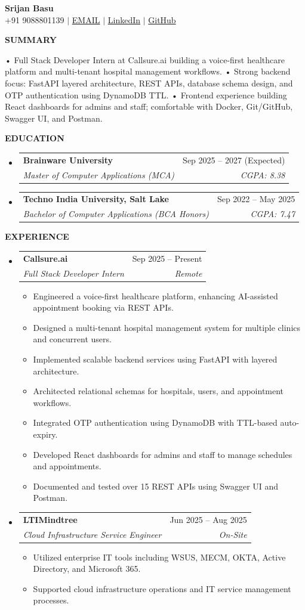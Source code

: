 \documentclass[a4paper,10pt]{article}
\makeatletter
\newcommand{\resheading}[1]{
  \vspace{8pt}
  {\color{black} \textbf{\large #1}}
  \vspace{-5pt}
  \hrulefill
  \vspace{3pt}
}
\newcommand{\ressubheading}[4]{
  \begin{tabular*}{\textwidth}{l@{\extracolsep{\fill}}r}
    \textbf{#1} & #2 \\
    \textit{\small #3} & \textit{\small #4} \\
  \end{tabular*}\vspace{-5pt}
}
\newcommand{\resitem}[1]{
  \item \small{
    {#1 \vspace{-2pt}}
  }
}
\makeatother
\begin{document}
\begin{center}
    \textbf{\Huge Srijan Basu} \\ \vspace{3pt}
    \small +91 9088801139 $|$ \href{mailto:2003srijanbasu@gmail.com}{{{EMAIL}}} $|$ 
    \href{https://}{LinkedIn} $|$ 
    \href{https://}{GitHub} 
\end{center}

\resheading{SUMMARY}
\small • Full Stack Developer Intern at Callsure.ai building a voice-first healthcare platform and multi-tenant hospital management workflows.
• Strong backend focus: FastAPI layered architecture, REST APIs, database schema design, and OTP authentication using DynamoDB TTL.
• Frontend experience building React dashboards for admins and staff; comfortable with Docker, Git/GitHub, Swagger UI, and Postman.


\resheading{EDUCATION}
\begin{itemize}[leftmargin=*,nosep]
\item[] \ressubheading{Brainware University}{Sep 2025 – 2027 (Expected)}{Master of Computer Applications (MCA)}{CGPA: 8.38}
\item[] \ressubheading{Techno India University, Salt Lake}{Sep 2022 – May 2025}{Bachelor of Computer Applications (BCA Honors)}{CGPA: 7.47}
\end{itemize}

\resheading{EXPERIENCE}
\begin{itemize}[leftmargin=*,nosep]
\item[] \ressubheading{Callsure.ai}{Sep 2025 – Present}{Full Stack Developer Intern}{Remote}
\begin{itemize}[leftmargin=12pt,nosep,topsep=2pt]
  \resitem{Engineered a voice-first healthcare platform, enhancing AI-assisted appointment booking via REST APIs.}
  \resitem{Designed a multi-tenant hospital management system for multiple clinics and concurrent users.}
  \resitem{Implemented scalable backend services using FastAPI with layered architecture.}
  \resitem{Architected relational schemas for hospitals, users, and appointment workflows.}
  \resitem{Integrated OTP authentication using DynamoDB with TTL-based auto-expiry.}
  \resitem{Developed React dashboards for admins and staff to manage schedules and appointments.}
  \resitem{Documented and tested over 15 REST APIs using Swagger UI and Postman.}
\end{itemize}
\item[] \ressubheading{LTIMindtree}{Jun 2025 – Aug 2025}{Cloud Infrastructure Service Engineer}{On-Site}
\begin{itemize}[leftmargin=12pt,nosep,topsep=2pt]
  \resitem{Utilized enterprise IT tools including WSUS, MECM, OKTA, Active Directory, and Microsoft 365.}
  \resitem{Supported cloud infrastructure operations and IT service management processes.}
\end{itemize}
\end{itemize}
\end{document}
